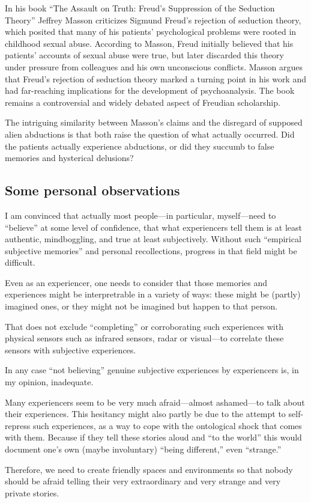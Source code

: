 In his book ``The Assault on Truth: Freud's Suppression of the Seduction Theory''
Jeffrey Masson criticizes Sigmund Freud's rejection of seduction theory,
which posited that many of his patients' psychological problems were rooted in childhood sexual abuse.
According to Masson, Freud initially believed that his patients' accounts of sexual abuse were true,
but later discarded this theory under pressure from colleagues and his own unconscious conflicts.
Masson argues that Freud's rejection of seduction theory marked a turning point in his work and had far-reaching implications for the development of psychoanalysis.
The book remains a controversial and widely debated aspect of Freudian scholarship.

The intriguing similarity between Masson's claims and the disregard of supposed alien abductions is that both raise the question of what actually occurred. Did the patients actually experience abductions,
or did they succumb to false memories and hysterical delusions?


\subsection{Some personal observations}

I am convinced that actually most people---in particular, myself---need to ``believe''
at some level of confidence, that what experiencers tell them is at least authentic, mindboggling, and true
at least subjectively.
Without such ``empirical subjective memories'' and personal recollections, progress in that field might be difficult.

Even as an experiencer, one needs to consider that those memories and experiences
might be interpretrable in a variety of ways:
these might be (partly) imagined ones, or they might not be imagined but happen to that person.


That does not exclude ``completing'' or corroborating such experiences
with physical sensors such as infrared sensors, radar or visual---to correlate
these sensors with subjective experiences.

In any case ``not believing'' genuine subjective experiences by experiencers is, in my opinion, inadequate.

Many experiencers seem to be very much afraid---almost ashamed---to talk about their experiences.
This hesitancy might also partly be due to the attempt to self-repress such experiences,
as a way to cope with the ontological shock that comes with them.
Because if they tell these stories aloud and ``to the world'' this would document one's own (maybe involuntary)
``being different,'' even ``strange.''

Therefore, we need to create friendly spaces and environments
so that nobody should be afraid telling their very extraordinary and very strange and very private stories.
